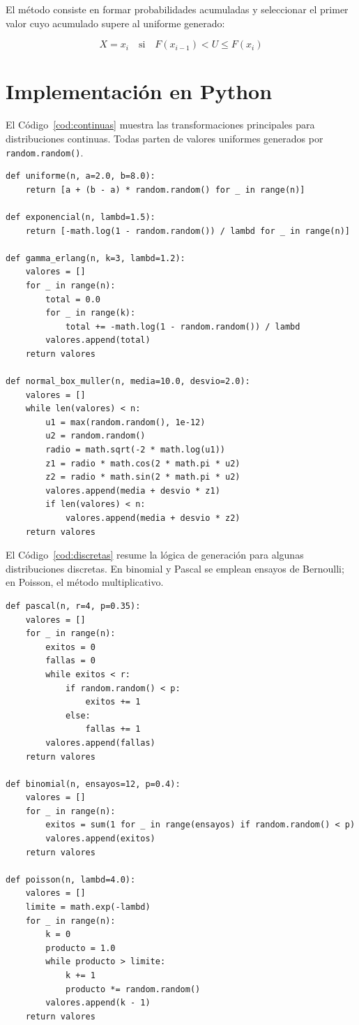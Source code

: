 \documentclass{article}
\begin{document}
El método consiste en formar probabilidades acumuladas y seleccionar el primer
valor cuyo acumulado supere al uniforme generado:

\begin{equation}
    X=x_i \quad \text{si} \quad F(x_{i-1}) < U \leq F(x_i)
\end{equation}

\section{Implementación en Python}

El Código~\ref{cod:continuas} muestra las transformaciones principales para
distribuciones continuas. Todas parten de valores uniformes generados por
\texttt{random.random()}.

\begin{lstlisting}[caption={Generadores continuos implementados en Python.}, label={cod:continuas}]
def uniforme(n, a=2.0, b=8.0):
    return [a + (b - a) * random.random() for _ in range(n)]

def exponencial(n, lambd=1.5):
    return [-math.log(1 - random.random()) / lambd for _ in range(n)]

def gamma_erlang(n, k=3, lambd=1.2):
    valores = []
    for _ in range(n):
        total = 0.0
        for _ in range(k):
            total += -math.log(1 - random.random()) / lambd
        valores.append(total)
    return valores

def normal_box_muller(n, media=10.0, desvio=2.0):
    valores = []
    while len(valores) < n:
        u1 = max(random.random(), 1e-12)
        u2 = random.random()
        radio = math.sqrt(-2 * math.log(u1))
        z1 = radio * math.cos(2 * math.pi * u2)
        z2 = radio * math.sin(2 * math.pi * u2)
        valores.append(media + desvio * z1)
        if len(valores) < n:
            valores.append(media + desvio * z2)
    return valores
\end{lstlisting}

El Código~\ref{cod:discretas} resume la lógica de generación para algunas
distribuciones discretas. En binomial y Pascal se emplean ensayos de Bernoulli;
en Poisson, el método multiplicativo.

\begin{lstlisting}[caption={Generadores discretos implementados en Python.}, label={cod:discretas}]
def pascal(n, r=4, p=0.35):
    valores = []
    for _ in range(n):
        exitos = 0
        fallas = 0
        while exitos < r:
            if random.random() < p:
                exitos += 1
            else:
                fallas += 1
        valores.append(fallas)
    return valores

def binomial(n, ensayos=12, p=0.4):
    valores = []
    for _ in range(n):
        exitos = sum(1 for _ in range(ensayos) if random.random() < p)
        valores.append(exitos)
    return valores

def poisson(n, lambd=4.0):
    valores = []
    limite = math.exp(-lambd)
    for _ in range(n):
        k = 0
        producto = 1.0
        while producto > limite:
            k += 1
            producto *= random.random()
        valores.append(k - 1)
    return valores
\end{lstlisting}
\end{document}
